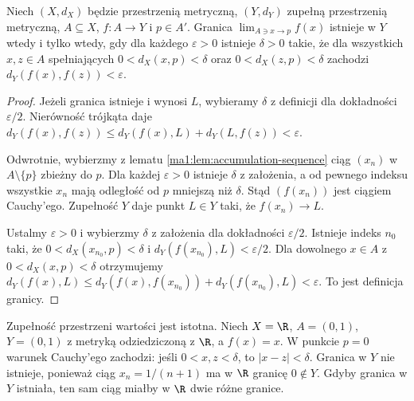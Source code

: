 \begin{twierdzenie}
\label{ma1:thm:function-limit-cauchy}
Niech $(X,d_X)$ będzie przestrzenią metryczną, $(Y,d_Y)$ zupełną przestrzenią metryczną, $A\subseteq X$, $f:A\to Y$ i $p\in A'$. Granica $\lim_{A\ni x\to p}f(x)$ istnieje w $Y$ wtedy i tylko wtedy, gdy dla każdego $\varepsilon>0$ istnieje $\delta>0$ takie, że dla wszystkich $x,z\in A$ spełniających
$0<d_X(x,p)<\delta$ oraz $0<d_X(z,p)<\delta$ zachodzi $d_Y(f(x),f(z))<\varepsilon$.
\end{twierdzenie}
\begin{proof}
Jeżeli granica istnieje i wynosi $L$, wybieramy $\delta$ z definicji dla dokładności $\varepsilon/2$. Nierówność trójkąta daje
$d_Y(f(x),f(z))\le d_Y(f(x),L)+d_Y(L,f(z))<\varepsilon$.

Odwrotnie, wybierzmy z lematu \ref{ma1:lem:accumulation-sequence} ciąg $(x_n)$ w $A\setminus\{p\}$ zbieżny do $p$. Dla każdej $\varepsilon>0$ istnieje $\delta$ z założenia, a od pewnego indeksu wszystkie $x_n$ mają odległość od $p$ mniejszą niż $\delta$. Stąd $(f(x_n))$ jest ciągiem Cauchy'ego. Zupełność $Y$ daje punkt $L\in Y$ taki, że $f(x_n)\to L$.

Ustalmy $\varepsilon>0$ i wybierzmy $\delta$ z założenia dla dokładności $\varepsilon/2$. Istnieje indeks $n_0$ taki, że $0<d_X(x_{n_0},p)<\delta$ i $d_Y(f(x_{n_0}),L)<\varepsilon/2$. Dla dowolnego $x\in A$ z $0<d_X(x,p)<\delta$ otrzymujemy
$d_Y(f(x),L)\le d_Y(f(x),f(x_{n_0}))+d_Y(f(x_{n_0}),L)<\varepsilon$.
To jest definicja granicy.
\end{proof}
\begin{przyklad}
\label{ma1:ex:incomplete-limit-target}
Zupełność przestrzeni wartości jest istotna. Niech $X=\R$, $A=(0,1)$, $Y=(0,1)$ z metryką odziedziczoną z $\R$, a $f(x)=x$. W punkcie $p=0$ warunek Cauchy'ego zachodzi: jeśli $0<x,z<\delta$, to $|x-z|<\delta$. Granica w $Y$ nie istnieje, ponieważ ciąg $x_n=1/(n+1)$ ma w $\R$ granicę $0\notin Y$. Gdyby granica w $Y$ istniała, ten sam ciąg miałby w $\R$ dwie różne granice.
\end{przyklad}

